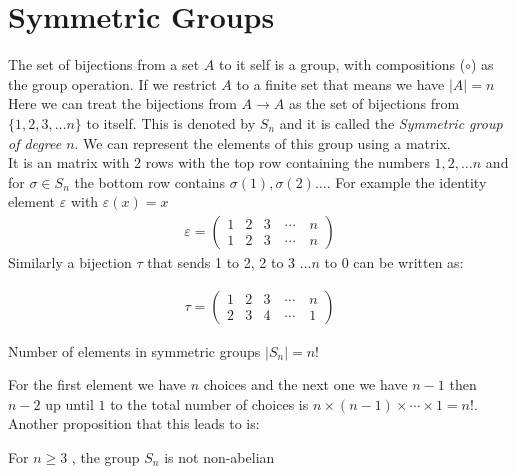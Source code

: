 \documentclass[16pt,a4paper]{article}
\theoremstyle{definition}
\begin{document}
\section{Symmetric Groups}
The set of bijections from a set $A$ to it self is a group, with compositions ($\circ$) as the group operation. If we restrict $A$ to a finite set that means we have $|A| = n$ Here we can treat the bijections from $A\rightarrow A$ as the set of bijections from $\{1,2,3,\ldots n\}$ to itself. This is denoted by $S_n$ and it is called the \emph{Symmetric group of degree $n$}. We can represent the elements of this group using a matrix. 
\\
It is an matrix with 2 rows with the top row containing the numbers $1,2,\ldots n$ and for $\sigma \in S_n$ the bottom row contains $\sigma(1), \sigma(2)\ldots$. For example the identity element $\varepsilon$ with $\varepsilon(x)=x$ 
\begin{align*}
\varepsilon = 
\begin{pmatrix}
1 & 2 & 3 \quad\cdots \quad n \\
1 & 2 & 3 \quad \cdots \quad n
\end{pmatrix}
\end{align*}
Similarly a bijection $\tau$ that sends 1 to 2, 2 to 3 $\ldots n$ to 0 can be written as:

\begin{align*}
\tau = 
\begin{pmatrix}
1 & 2 & 3 \quad\cdots \quad n \\
2 & 3 & 4 \quad \cdots \quad 1
\end{pmatrix}
\end{align*}

\begin{prop}{Number of elements in symmetric groups}{}
$|S_n| = n!$
\end{prop}
For the first element we have $n$ choices and the next one we have $n-1$ then $n-2$ up until $1$ to the total number of choices is $n\times (n-1) \times \cdots \times 1 = n!$.  Another proposition that this leads to is: 

\begin{prop}{}{}
For $n\geq 3$ , the group $S_n$ is not non-abelian 
\end{prop} 
\end{document}
